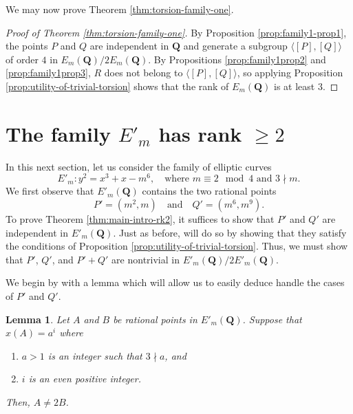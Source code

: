 \documentclass{amsart}
\newtheorem{lemma}[theorem]{Lemma}
\numberwithin{equation}{section}
\theoremstyle{remark}
\newcommand{\Q}{\mathbf{Q}}
\begin{document}
We may now prove Theorem \ref{thm:torsion-family-one}.

\begin{proof}[Proof of Theorem \ref{thm:torsion-family-one}]

By Proposition \ref{prop:family1-prop1}, the points $P$ and $Q$ are independent in $\Q$ and generate a subgroup $\langle[P],[Q]\rangle$ of order $4$ in $E_m(\Q)/2E_m(\Q)$. By Propositions \ref{prop:family1prop2} and \ref{prop:family1prop3}, $R$ does not belong to $\langle [P], [Q] \rangle$, so applying Proposition \ref{prop:utility-of-trivial-torsion} shows that the rank of $E_m(\Q)$ is at least $3$.
\end{proof}

\section{The family $E'_m$ has rank $\geq 2$}\label{sec:family2}

In this next section, let us consider the family of elliptic curves
\[
E'_m \colon y^2 = x^3+x-m^6, \quad \text{where $m\equiv 2 \mod 4$ and $3 \nmid m$}.
\]
We first observe that $E'_m(\Q)$ contains the two rational points
\[
P'=(m^2,m) \quad \text{and} \quad Q'=(m^6,m^9).
\]
To prove Theorem \ref{thm:main-intro-rk2}, it suffices to show that $P'$ and $Q'$ are independent in $E'_m(\Q)$. Just as before, will do so by showing that they satisfy the conditions of Proposition \ref{prop:utility-of-trivial-torsion}. Thus, we must show that $P'$, $Q'$, and $P'+Q'$ are nontrivial in $E'_m(\Q)/2E'_m(\Q)$.

We begin by with a lemma which will allow us to easily deduce handle the cases of $P'$ and $Q'$.

\begin{lemma}\label{lem:family2prop1}
Let $A$ and $B$ be rational points in $E'_m(\Q)$. Suppose that $x(A)=a^{i}$ where
\begin{enumerate}
\item $a>1$ is an integer such that $3 \nmid a$, and
\item $i$ is an even positive integer.

\end{enumerate}
Then, $A \neq 2B$.
\end{lemma}
\end{document}
